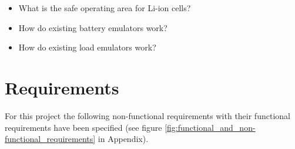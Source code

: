 \begin{itemize}
    \item What is the safe operating area for Li-ion cells?
    \item How do existing battery emulators work?
    \item How do existing load emulators work?
\end{itemize}

\section{Requirements}
For this project the following non-functional requirements with their functional requirements have been specified (see figure \ref{fig:functional_and_non-functional_requirements} in Appendix).

